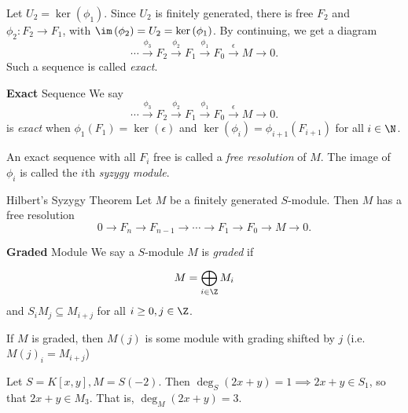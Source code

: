 \documentclass[co439]{subfiles}
\begin{document}
    Let $U_2=\ker\left( \phi_1 \right)$. Since $U_2$ is finitely generated, there is free $F_2$ and $\phi_2:F_2\to F_1$, with $\im\left( \phi_2 \right) = U_2 = \ker\left( \phi_1 \right)$. By continuing, we get a diagram
    \begin{equation*}
        \cdots \overset{\phi_3}{\to} F_2 \overset{\phi_2}{\to} F_1 \overset{\phi_1}{\to} F_0 \overset{\epsilon}{\to} M\to 0.
    \end{equation*}
    Such a sequence is called \textit{exact}.

    \begin{definition}{\textbf{Exact} Sequence}
        We say
        \begin{equation*}
            \cdots \overset{\phi_3}{\to} F_2 \overset{\phi_2}{\to} F_1 \overset{\phi_1}{\to} F_0 \overset{\epsilon}{\to} M\to 0.
        \end{equation*}
        is \emph{exact} when $\phi_1\left( F_1 \right) = \ker\left( \epsilon \right)$ and $\ker\left( \phi_i \right) = \phi_{i+1}\left( F_{i+1} \right)$ for all $i\in\N$.
    \end{definition}

    An exact sequence with all $F_i$ free is called a \emph{free resolution} of $M$. The image of $\phi_i$ is called the $i$th \emph{syzygy module}.

    \begin{theorem}{Hilbert's Syzygy Theorem}
        Let $M$ be a finitely generated $S$-module. Then $M$ has a free resolution
        \begin{equation*}
            0\to F_n\to F_{n-1}\to\cdots\to F_1\to F_0\to M\to 0.
        \end{equation*}
    \end{theorem}

    \rruleline

    \begin{definition}{\textbf{Graded} Module}
        We say a $S$-module $M$ is \emph{graded} if
        \begin{equation*}
            M = \bigoplus^{}_{i\in\Z} M_i
        \end{equation*}
        and $S_iM_j\subseteq M_{i+j}$ for all $i\geq 0, j\in\Z$. 

        If $M$ is graded, then $M\left( j \right)$ is some module with grading shifted by $j$ (i.e. $M\left( j \right)_i = M_{i+j}$)
    \end{definition}

    \begin{example}{}
        Let $S = K\left[ x,y \right], M = S\left( -2 \right)$. Then $\deg_S\left( 2x+y \right) = 1 \implies 2x+y\in S_1$, so that $2x+y\in M_3$. That is, $\deg_M\left( 2x+y \right) = 3$.
    \end{example}
\end{document}
